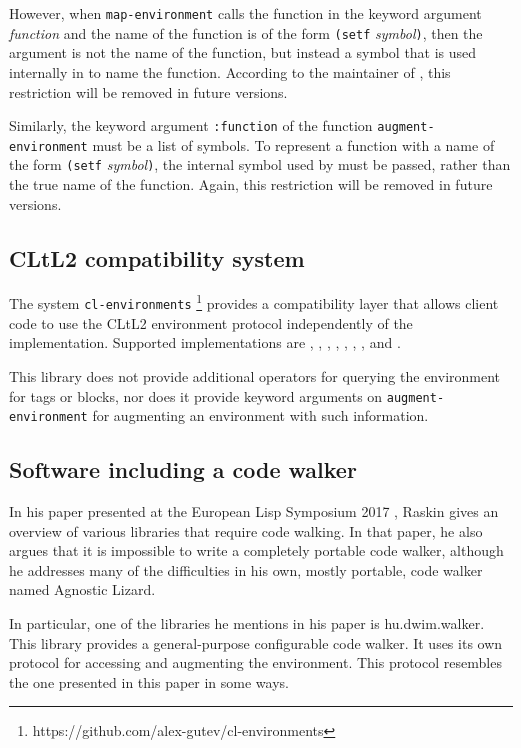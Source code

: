 \noindent
However, when \texttt{map-environment} calls the function in the
keyword argument \textit{function} and the name of the function is of
the form \texttt{(setf} \textit{symbol}\texttt{)}, then the argument
is not the name of the function, but instead a symbol that is used
internally in \lispworks{} to name the function.  According to the
maintainer of \lispworks{}, this restriction will be removed in future
versions.

Similarly, the keyword argument \texttt{:function} of the function
\texttt{augment-environment} must be a list of symbols.  To represent
a function with a name of the form \texttt{(setf}
\textit{symbol}\texttt{)}, the internal symbol used by \lispworks{}
must be passed, rather than the true name of the function.  Again,
this restriction will be removed in future versions.

\subsection{CLtL2 compatibility system}

The system \texttt{cl-environments}%
\footnote{https://github.com/alex-gutev/cl-environments}
provides a compatibility layer that allows client code to use the
CLtL2 environment protocol independently of the \commonlisp{}
implementation.  Supported \commonlisp{} implementations are \clisp{},
\ccl{}, \ecl{}, \abcl{}, \cmucl{}, \sbcl{}, \allegro{}, and
\lispworks{}.

This library does not provide additional operators for querying the
environment for tags or blocks, nor does it provide keyword arguments
on \texttt{augment-environment} for augmenting an environment with
such information.

\subsection{Software including a code walker}

In his paper presented at the European Lisp Symposium 2017
\cite{raskin_mikhail_2017_3254669}, Raskin gives an overview of
various libraries that require code walking.  In that paper, he also
argues that it is impossible to write a completely portable code
walker, although he addresses many of the difficulties in his own,
mostly portable, code walker named Agnostic Lizard.

In particular, one of the libraries he mentions in his paper is
hu.dwim.walker.  This library provides a general-purpose configurable
code walker.  It uses its own protocol for accessing and augmenting
the environment.  This protocol resembles the one presented in this
paper in some ways.

